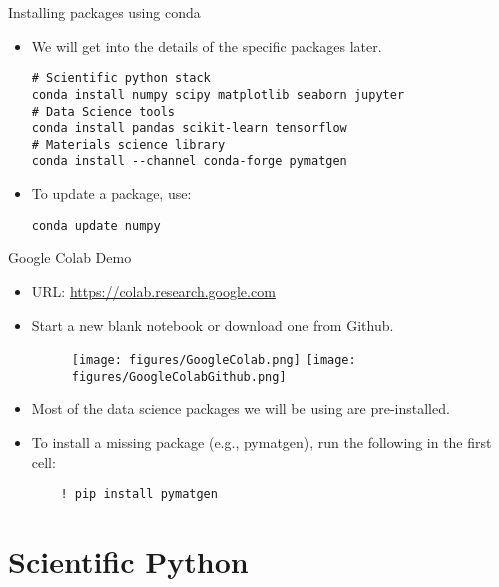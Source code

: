 \documentclass[aspectratio=169]{beamer}
\begin{document}
    \begin{frame}[fragile]{Installing packages using conda}
        \begin{itemize}
            \item We will get into the details of the specific packages later.
            \begin{verbatim}
# Scientific python stack
conda install numpy scipy matplotlib seaborn jupyter
# Data Science tools
conda install pandas scikit-learn tensorflow
# Materials science library
conda install --channel conda-forge pymatgen
            \end{verbatim}
            \item To update a package, use:
            \begin{verbatim}
conda update numpy
            \end{verbatim}
        \end{itemize}
    \end{frame}


    \begin{frame}[fragile]{Google Colab Demo}
        \begin{itemize}
            \item URL: \url{https://colab.research.google.com}
            \item Start a new blank notebook or download one from Github.
            \begin{figure}
                \centering
                \texttt{[image: figures/GoogleColab.png]}
                \texttt{[image: figures/GoogleColabGithub.png]}
            \end{figure}
            \item Most of the data science packages we will be using are pre-installed.
            \item To install a missing package (e.g., pymatgen), run the following in the first cell:
            \begin{verbatim}
    ! pip install pymatgen
            \end{verbatim}
        \end{itemize}
    \end{frame}


    \section{Scientific Python}
\end{document}
